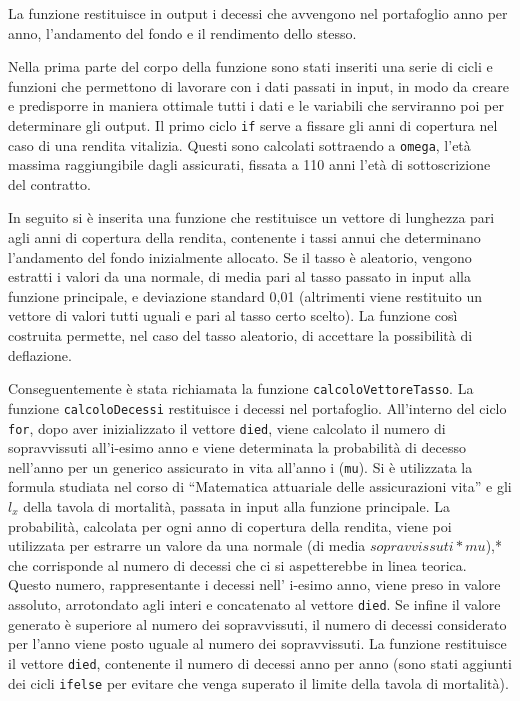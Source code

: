 \documentclass[
]{article}
\begin{document}
La funzione restituisce in output i decessi che avvengono nel
portafoglio anno per anno, l'andamento del fondo e il rendimento dello
stesso.

Nella prima parte del corpo della funzione sono stati inseriti una serie
di cicli e funzioni che permettono di lavorare con i dati passati in
input, in modo da creare e predisporre in maniera ottimale tutti i dati
e le variabili che serviranno poi per determinare gli output. Il primo
ciclo \texttt{if} serve a fissare gli anni di copertura nel caso di una
rendita vitalizia. Questi sono calcolati sottraendo a \texttt{omega},
l'età massima raggiungibile dagli assicurati, fissata a 110 anni l'età
di sottoscrizione del contratto.

In seguito si è inserita una funzione che restituisce un vettore di
lunghezza pari agli anni di copertura della rendita, contenente i tassi
annui che determinano l'andamento del fondo inizialmente allocato. Se il
tasso è aleatorio, vengono estratti i valori da una normale, di media
pari al tasso passato in input alla funzione principale, e deviazione
standard 0,01 (altrimenti viene restituito un vettore di valori tutti
uguali e pari al tasso certo scelto). La funzione così costruita
permette, nel caso del tasso aleatorio, di accettare la possibilità di
deflazione.

Conseguentemente è stata richiamata la funzione
\texttt{calcoloVettoreTasso}. La funzione \texttt{calcoloDecessi}
restituisce i decessi nel portafoglio. All'interno del ciclo
\texttt{for}, dopo aver inizializzato il vettore \texttt{died}, viene
calcolato il numero di sopravvissuti all'i-esimo anno e viene
determinata la probabilità di decesso nell'anno per un generico
assicurato in vita all'anno i (\texttt{mu}). Si è utilizzata la formula
studiata nel corso di ``Matematica attuariale delle assicurazioni vita''
e gli \(l_x\) della tavola di mortalità, passata in input alla funzione
principale. La probabilità, calcolata per ogni anno di copertura della
rendita, viene poi utilizzata per estrarre un valore da una normale (di
media \(sopravvissuti*mu\)),* che corrisponde al numero di decessi che
ci si aspetterebbe in linea teorica. Questo numero, rappresentante i
decessi nell' i-esimo anno, viene preso in valore assoluto, arrotondato
agli interi e concatenato al vettore \texttt{died}. Se infine il valore
generato è superiore al numero dei sopravvissuti, il numero di decessi
considerato per l'anno viene posto uguale al numero dei sopravvissuti.
La funzione restituisce il vettore \texttt{died}, contenente il numero
di decessi anno per anno (sono stati aggiunti dei cicli \texttt{ifelse}
per evitare che venga superato il limite della tavola di mortalità).
\end{document}
